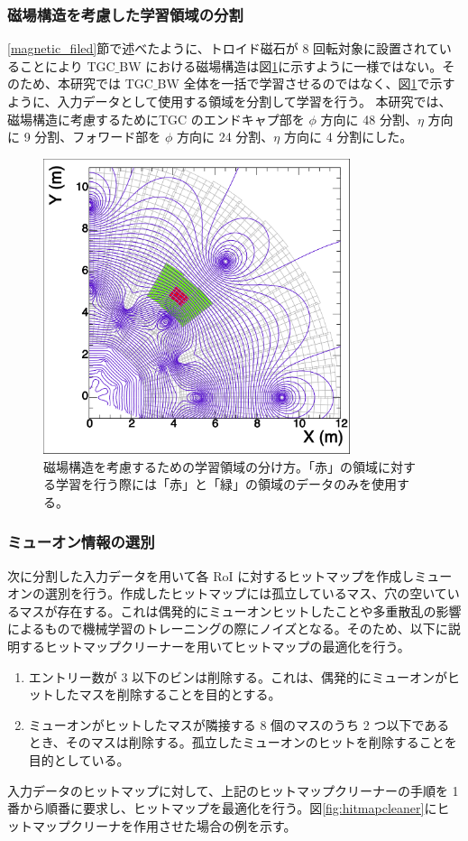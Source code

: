 \subsubsection{磁場構造を考慮した学習領域の分割}
\ref{magnetic_filed}節で述べたように、トロイド磁石が 8 回転対象に設置されていることにより TGC$\_$BW における磁場構造は図\ref{fig:Mag}に示すように一様ではない。そのため、本研究では TGC$\_$BW 全体を一括で学習させるのではなく、図\ref{fig:Mag}で示すように、入力データとして使用する領域を分割して学習を行う。
本研究では、磁場構造に考慮するためにTGC のエンドキャプ部を $\phi$ 方向に 48 分割、$\eta$ 方向に 9 分割、フォワード部を $\phi$ 方向に 24 分割、$\eta$ 方向に 4 分割にした。
\begin{figure}[tb]
  \centering
  \includegraphics[clip, width=9cm]{fig/4/c1_withMag.pdf}
  \caption{磁場構造を考慮するための学習領域の分け方。「赤」の領域に対する学習を行う際には「赤」と「緑」の領域のデータのみを使用する。}
  \label{fig:Mag}
\end{figure}

\subsubsection{ミューオン情報の選別}
次に分割した入力データを用いて各 RoI に対するヒットマップを作成しミューオンの選別を行う。作成したヒットマップには孤立しているマス、穴の空いているマスが存在する。これは偶発的にミューオンヒットしたことや多重散乱の影響によるもので機械学習のトレーニングの際にノイズとなる。そのため、以下に説明するヒットマップクリーナーを用いてヒットマップの最適化を行う。
\begin{enumerate}
   \item エントリー数が 3 以下のビンは削除する。これは、偶発的にミューオンがヒットしたマスを削除することを目的とする。
   \item ミューオンがヒットしたマスが隣接する 8 個のマスのうち 2 つ以下であるとき、そのマスは削除する。孤立したミューオンのヒットを削除することを目的としている。
\end{enumerate}
入力データのヒットマップに対して、上記のヒットマップクリーナーの手順を 1 番から順番に要求し、ヒットマップを最適化を行う。図\ref{fig:hitmapcleaner}にヒットマップクリーナを作用させた場合の例を示す。

